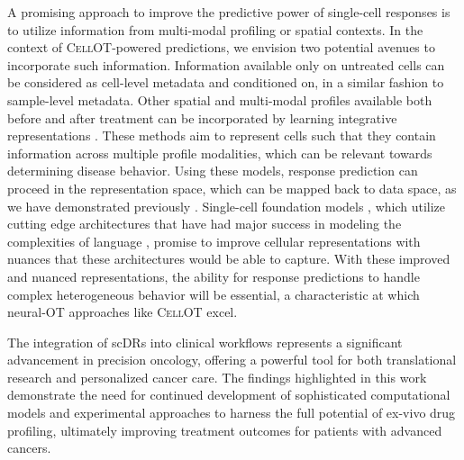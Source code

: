 %

A promising approach to improve the predictive power of single-cell responses is to utilize information from multi-modal profiling or spatial contexts.
In the context of \textsc{CellOT}-powered predictions, we envision two potential avenues to incorporate such information.
Information available only on untreated cells can be considered as cell-level metadata and conditioned on, in a similar fashion to sample-level metadata.
Other spatial and multi-modal profiles available both before and after treatment can be incorporated by learning integrative representations \cite{lotfollahi2019, cao2022a}.
These methods aim to represent cells such that they contain information across multiple profile modalities, which can be relevant towards determining disease behavior.
Using these models, response prediction can proceed in the representation space, which can be mapped back to data space, as we have demonstrated previously \cite{bunne2023}.
Single-cell foundation models \cite{theodoris2023,cui2024,ma2024}, which utilize cutting edge architectures that have had major success in modeling the complexities of language \cite{vaswani2023, devlin2019, openai2024},
promise to improve cellular representations with nuances that these architectures would be able to capture.
With these improved and nuanced representations, the ability for response predictions to handle complex heterogeneous behavior will be essential, a characteristic at which neural-OT approaches like \textsc{CellOT} excel.


The integration of scDRs into clinical workflows represents a significant advancement in precision oncology, offering a powerful tool for both translational research and personalized cancer care.
The findings highlighted in this work demonstrate the need for continued development of sophisticated computational models and experimental approaches to harness the full potential of ex-vivo drug profiling, ultimately improving treatment outcomes for patients with advanced cancers. 
